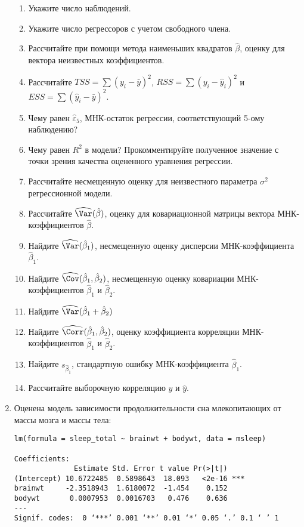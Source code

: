\documentclass[pdftex,12pt,a4paper]{article}
\def \hb{\hat{\beta}}
\def \hy{\hat{y}}
\def \he{\hat{\varepsilon}}
\def \hCorr{\widehat{\Corr}}
\begin{document}
\begin{enumerate}
\begin{enumerate}
\item Укажите число наблюдений.
\here
\item Укажите число регрессоров с учетом свободного члена.
\here
\item Рассчитайте при помощи метода наименьших квадратов $\hb$, оценку для вектора неизвестных коэффициентов.
\here
\item Рассчитайте $TSS=\sum (y_i-\bar{y})^2$, $RSS=\sum (y_i-\hat{y}_i)^2$ и $ESS=\sum (\hat{y}_i-\bar{y})^2$.
\here
\item Чему равен $\he_5$, МНК-остаток регрессии, соответствующий 5-ому наблюдению?
\here
\item Чему равен $R^2$  в модели? Прокомментируйте полученное значение с точки зрения качества оцененного уравнения регрессии.
\here
\item Рассчитайте несмещенную оценку для неизвестного параметра $\sigma^2$ регрессионной модели.
\here
\item Рассчитайте $\widehat{\Var}(\hb)$, оценку для ковариационной матрицы вектора МНК-коэффициентов $\hb$.  
\here
\item Найдите $\widehat{\Var}(\hb_1)$, несмещенную оценку дисперсии МНК-коэффициента $\hb_1$.
\here
\item Найдите $\widehat{\Cov}(\hb_1,\hb_2)$, несмещенную оценку ковариации МНК-коэффициентов $\hb_1$ и $\hb_2$.
\here
\item Найдите $\widehat{\Var}(\hb_1+\hb_2)$
\here
\item Найдите $\hCorr(\hb_1,\hb_2)$, оценку коэффициента корреляции МНК-коэффициентов $\hb_1$ и $\hb_2$.
\here
\item Найдите $s_{\hb_1}$, стандартную ошибку МНК-коэффициента $\hb_1$.
\here
\item Рассчитайте выборочную корреляцию $y$ и $\hy$.
\here

\end{enumerate}
\item Оценена модель зависимости продолжительности сна млекопитающих от массы мозга и массы тела:

\begin{verbatim}
lm(formula = sleep_total ~ brainwt + bodywt, data = msleep)

Coefficients:
              Estimate Std. Error t value Pr(>|t|)    
(Intercept) 10.6722485  0.5898643  18.093   <2e-16 ***
brainwt     -2.3518943  1.6180072  -1.454    0.152    
bodywt       0.0007953  0.0016703   0.476    0.636    
---
Signif. codes:  0 ‘***’ 0.001 ‘**’ 0.01 ‘*’ 0.05 ‘.’ 0.1 ‘ ’ 1 


\end{verbatim}
\end{enumerate}
\end{document}
